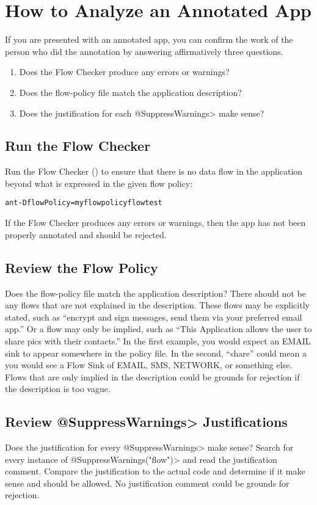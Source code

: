 \htmlhr
\chapter{How to Analyze an Annotated App\label{analyze-annotated-app}}

If you are presented with an annotated app, you can confirm the work of the
person who did the annotation by answering affirmatively three questions.

\begin{enumerate}
\item Does the Flow Checker produce any errors or warnings?
\item Does the flow-policy file match the application description?
\item Does the justification for each \<@SuppressWarnings> make sense?
\end{enumerate}

\section{Run the Flow Checker}

Run the Flow Checker () to ensure that there is no
data flow in the application beyond what is expressed in the given flow
policy:

\begin{alltt}
ant -DflowPolicy=myflowpolicy flowtest
\end{alltt}

If the Flow Checker produces any errors or warnings, then the app has not
been properly annotated and should be rejected.

\section{Review the Flow Policy}
Does the flow-policy file match the application description? There should
not be any flows that are not explained in the description.  These flows
may be explicitly stated, such as ``encrypt and sign messages, send them
via your preferred email app.''  Or a flow may only be implied, such as
``This Application allows the user to share pics with their contacts.''  In
the first example, you would expect an EMAIL sink to appear somewhere in
the policy file. In the second, ``share'' could mean a you would see a Flow
Sink of EMAIL, SMS, NETWORK, or something else.  Flows that are only
implied in the description could be grounds for rejection if the
description is too vague.

\section{Review \<@SuppressWarnings> Justifications}
Does the justification for every \<@SuppressWarnings> make sense? Search
for every instance of \<@SuppressWarnings("flow")> and read the
justification comment.  Compare the justification to the actual code and
determine if it make sense and should be allowed.  No justification comment
could be grounds for rejection.
  

